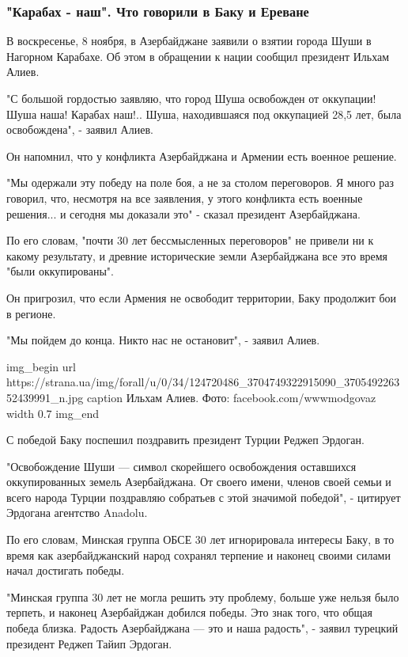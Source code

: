 \subsubsection{"Карабах - наш". Что говорили в Баку и Ереване}

В воскресенье, 8 ноября, в Азербайджане заявили о взятии города Шуши в Нагорном
Карабахе. Об этом в обращении к нации сообщил президент Ильхам Алиев.

"С большой гордостью заявляю, что город Шуша освобожден от оккупации! Шуша
наша! Карабах наш!.. Шуша, находившаяся под оккупацией 28,5 лет, была
освобождена", - заявил Алиев.

Он напомнил, что у конфликта Азербайджана и Армении есть военное решение.

"Мы одержали эту победу на поле боя, а не за столом переговоров. Я много раз
говорил, что, несмотря на все заявления, у этого конфликта есть военные
решения... и сегодня мы доказали это" - сказал президент Азербайджана.

По его словам, "почти 30 лет бессмысленных переговоров" не привели ни к какому
результату, и древние исторические земли Азербайджана все это время "были
оккупированы".

Он пригрозил, что если Армения не освободит территории, Баку продолжит бои в
регионе.

"Мы пойдем до конца. Никто нас не остановит", - заявил Алиев.

\ifcmt
img_begin 
	url https://strana.ua/img/forall/u/0/34/124720486_3704749322915090_370549226352439991_n.jpg
	caption Ильхам Алиев. Фото: facebook.com/wwwmodgovaz
	width 0.7
img_end
\fi

С победой Баку поспешил поздравить президент Турции Реджеп Эрдоган.

"Освобождение Шуши — символ скорейшего освобождения оставшихся оккупированных
земель Азербайджана. От своего имени, членов своей семьи и всего народа Турции
поздравляю собратьев с этой значимой победой", - цитирует Эрдогана агентство
Anadolu.

По его словам, Минская группа ОБСЕ 30 лет игнорировала интересы Баку, в то
время как азербайджанский народ сохранял терпение и наконец своими силами начал
достигать победы.

"Минская группа 30 лет не могла решить эту проблему, больше уже нельзя было
терпеть, и наконец Азербайджан добился победы. Это знак того, что общая победа
близка. Радость Азербайджана — это и наша радость", - заявил турецкий президент
Реджеп Тайип Эрдоган.

